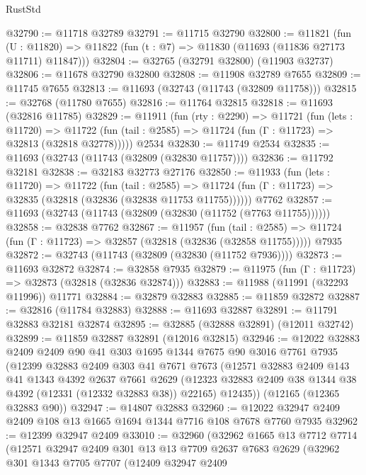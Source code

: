 \begin{lexlean}{RustStd}
\begin{coremodule}
@32790 := @11718 @32789
@32791 := @11715 @32790
@32800 := @11821
    (fun (U : @11820) => @11822 (fun (t : @7) => @11830 (@11693 (@11836 @27173 @11711) @11847)))
@32804 := @32765 (@32791 @32800) (@11903 @32737)
@32806 := @11678 @32790 @32800
@32808 := @11908 @32789 @7655
@32809 := @11745 @7655
@32813 := @11693 (@32743 (@11743 (@32809 @11758)))
@32815 := @32768 (@11780 @7655)
@32816 := @11764 @32815
@32818 := @11693 (@32816 @11785)
@32829 := @11911
    (fun (rty : @2290) =>
    @11721
      (fun (lets : @11720) =>
      @11722 (fun (tail : @2585) => @11724 (fun (Γ : @11723) => @32813 (@32818 @32778)))))
    @2534
@32830 := @11749 @2534
@32835 := @11693 (@32743 (@11743 (@32809 (@32830 @11757))))
@32836 := @11792 @32181
@32838 := @32183 @32773 @27176
@32850 := @11933
    (fun (lets : @11720) =>
    @11722
      (fun (tail : @2585) =>
      @11724 (fun (Γ : @11723) => @32835 (@32818 (@32836 (@32838 @11753 @11755))))))
    @7762
@32857 := @11693 (@32743 (@11743 (@32809 (@32830 (@11752 (@7763 @11755))))))
@32858 := @32838 @7762
@32867 := @11957
    (fun (tail : @2585) => @11724 (fun (Γ : @11723) => @32857 (@32818 (@32836 (@32858 @11755)))))
    @7935
@32872 := @32743 (@11743 (@32809 (@32830 (@11752 @7936))))
@32873 := @11693 @32872
@32874 := @32858 @7935
@32879 := @11975 (fun (Γ : @11723) => @32873 (@32818 (@32836 @32874)))
@32883 := @11988 (@11991 (@32293 @11996)) @11771
@32884 := @32879 @32883
@32885 := @11859 @32872
@32887 := @32816 (@11784 @32883)
@32888 := @11693 @32887
@32891 := @11791 @32883 @32181 @32874
@32895 := @32885 (@32888 @32891) (@12011 @32742)
@32899 := @11859 @32887 @32891 (@12016 @32815)
@32946 := @12022
    @32883
    @2409
    @2409
    @90
    @41
    @303
    @1695
    @1344
    @7675
    @90
    @3016
    @7761
    @7935
    (@12399
      @32883
      @2409
      @303
      @41
      @7671
      @7673
      (@12571
        @32883
        @2409
        @143
        @41
        @1343
        @4392
        @2637
        @7661
        @2629
        (@12323 @32883 @2409 @38 @1344 @38 @4392 (@12331 (@12332 @32883 @38)) @22165)
        @12435))
    (@12165 (@12365 @32883 @90))
@32947 := @14807 @32883
@32960 := @12022 @32947 @2409 @2409 @108 @13 @1665 @1694 @1344 @7716 @108 @7678 @7760 @7935
@32962 := @12399 @32947 @2409
@33010 := @32960
    (@32962
      @1665
      @13
      @7712
      @7714
      (@12571
        @32947
        @2409
        @301
        @13
        @13
        @7709
        @2637
        @7683
        @2629
        (@32962
          @301
          @1343
          @7705
          @7707
          (@12409
            @32947
            @2409

\end{coremodule}
\end{lexlean}

